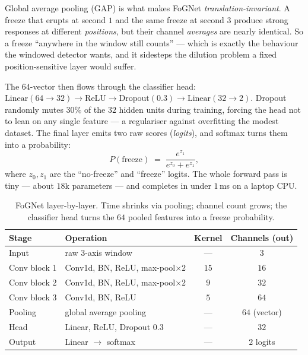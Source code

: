 \begin{keyidea}
Global average pooling (GAP) is what makes FoGNet \emph{translation-invariant}. A
freeze that erupts at second $1$ and the same freeze at second $3$ produce strong
responses at different \emph{positions}, but their channel \emph{averages} are nearly
identical. So a freeze ``anywhere in the window still counts'' --- which is exactly the
behaviour the windowed detector wants, and it sidesteps the dilution problem a fixed
position-sensitive layer would suffer.
\end{keyidea}

The $64$-vector then flows through the classifier head:
$\text{Linear}(64\!\to\!32)\to\text{ReLU}\to\text{Dropout}(0.3)\to\text{Linear}(32\!\to\!2)$.
Dropout randomly mutes $30\%$ of the $32$ hidden units during training, forcing the
head not to lean on any single feature --- a regulariser against overfitting the
modest dataset. The final layer emits two raw scores (\emph{logits}), and softmax
turns them into a probability:
\begin{equation}
  P(\text{freeze}) \;=\; \frac{e^{z_{1}}}{e^{z_{0}}+e^{z_{1}}},
  \label{eq:softmax}
\end{equation}
where $z_0,z_1$ are the ``no-freeze'' and ``freeze'' logits. The whole forward pass is
tiny --- about $18$k parameters --- and completes in under $1$\,\unit{\milli\second} on
a laptop CPU.

\begin{table}[H]
\centering
\caption{FoGNet layer-by-layer. Time shrinks via pooling; channel count grows; the
classifier head turns the $64$ pooled features into a freeze probability.}
\label{tab:fognet}
\small
\begin{tabular}{@{}llcc@{}}
\toprule
\textbf{Stage} & \textbf{Operation} & \textbf{Kernel} & \textbf{Channels (out)} \\
\midrule
Input        & raw 3-axis window               & ---  & $3$  \\
Conv block 1 & Conv1d, BN, ReLU, max-pool$\times2$ & $15$ & $16$ \\
Conv block 2 & Conv1d, BN, ReLU, max-pool$\times2$ & $9$  & $32$ \\
Conv block 3 & Conv1d, BN, ReLU                 & $5$  & $64$ \\
Pooling      & global average pooling          & ---  & $64$ (vector) \\
Head         & Linear, ReLU, Dropout $0.3$     & ---  & $32$ \\
Output       & Linear $\to$ softmax            & ---  & $2$ logits \\
\bottomrule
\end{tabular}
\end{table}


